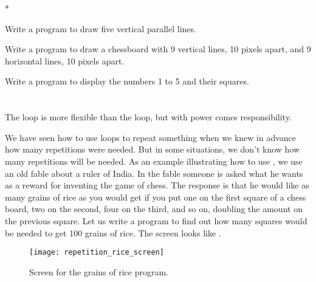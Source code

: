 		\begin{stqb}*
			\begin{STQ}
			\item	{} Write a program to draw five vertical parallel lines.
			\item	{} Write a program to draw a chessboard with 9 vertical lines, 10 pixels apart, and 9 horizontal lines, 10 pixels apart.
			\item	{} Write a program to display the numbers 1 to 5 and their squares.
			\end{STQ}
		\end{stqb}


	\section{}
		The  loop is more flexible than the  loop, but with power comes responsibility.
		
		We have seen how to use loops to repeat something when we knew in advance how many repetitions were needed. But in some situations, we don't know how many repetitions will be needed. As an example illustrating how to use , we use an old fable about a ruler of India. In the fable someone is asked what he wants as a reward for inventing the game of chess. The response is that he would like as many grains of rice as you would get if you put one on the first square of a chess board, two on the second, four on the third, and so on, doubling the amount on the previous square. Let us write a program to find out how many squares would be needed to get 100 grains of rice. The screen looks like .

		\begin{figure}[bth]
			\centering
			\texttt{[image: repetition\_rice\_screen]}
			\caption{Screen for the grains of rice program.}
			\label{fig:repetition_rice_screen}
		\end{figure}


